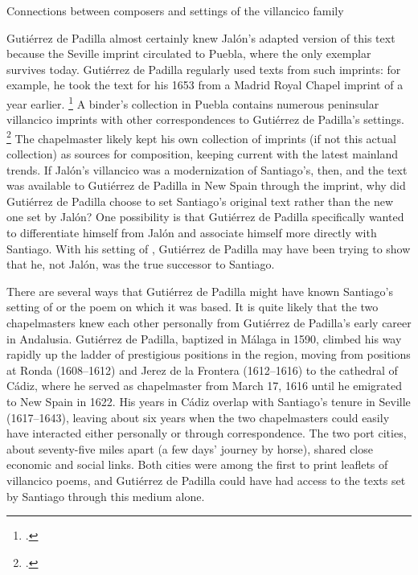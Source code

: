 {Connections between composers and settings of the  villancico
family}

Gutiérrez de Padilla almost certainly knew Jalón's adapted version of this text
because the Seville imprint circulated to Puebla, where the only exemplar
survives today.
Gutiérrez de Padilla regularly used texts from such imprints: for example, he
took the text for his 1653  from a Madrid Royal
Chapel imprint of a year earlier.%
    \footnote{.}
A binder's collection in Puebla contains numerous peninsular villancico imprints
with other correspondences to Gutiérrez de Padilla's settings.%
    \footnote{.}
The chapelmaster likely kept his own collection of imprints (if not this actual
collection) as sources for composition, keeping current with the latest mainland
trends.
If Jalón's villancico was a modernization of Santiago's, then, and the text was
available to Gutiérrez de Padilla in New Spain through the imprint, why did
Gutiérrez de Padilla choose to set Santiago's original text rather than the new
one set by Jalón?
One possibility is that Gutiérrez de Padilla specifically wanted to
differentiate himself from Jalón and associate himself more directly with
Santiago.
With his setting of , Gutiérrez de Padilla may
have been trying to show that he, not Jalón, was the true successor to Santiago.

There are several ways that Gutiérrez de Padilla might have known Santiago's
setting of  or the poem on which it was based.
It is quite likely that the two chapelmasters knew each other personally from
Gutiérrez de Padilla's early career in Andalusia.
Gutiérrez de Padilla, baptized in Málaga in 1590, climbed his way rapidly up the
ladder of prestigious positions in the region, moving from positions at Ronda
(1608--1612)
and Jerez de la Frontera (1612--1616) to the cathedral of Cádiz, where he served
as chapelmaster from March 17, 1616 until he emigrated to New Spain in 1622.%
    \Autocite{Gembero:Padilla}
His years in Cádiz overlap with Santiago's tenure in Seville (1617--1643),
leaving about six years when the two chapelmasters could easily have interacted
either personally or through correspondence.
The two port cities, about seventy-five miles apart (a few days' journey by
horse), shared close economic and social links.
Both cities were among the first to print leaflets of villancico poems, and
Gutiérrez de Padilla could have had access to the texts set by Santiago through
this medium alone.%
    \Autocite
    [ and \emph{Sevilla}]
    {BNE:VCs17C}


